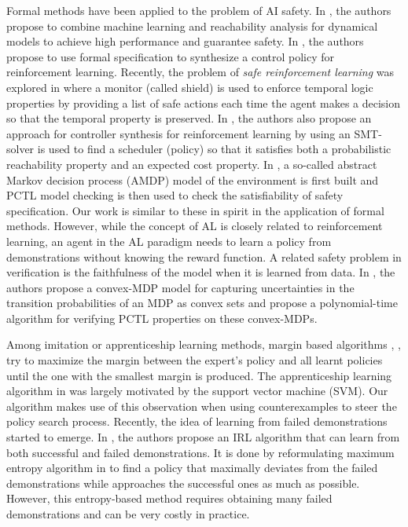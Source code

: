Formal methods have been applied to the problem of AI safety. 
In \cite{gillulay2011guaranteed}, the authors propose to combine machine learning and reachability analysis for dynamical models to achieve high performance and guarantee safety. In \cite{DBLP:journals/corr/SadighKCSS14}, the authors propose to use formal specification to synthesize a control policy for reinforcement learning. Recently, the problem of {\it safe reinforcement learning} was explored in \cite{DBLP:journals/corr/abs-1708-08611} where a monitor (called shield) is used to enforce temporal logic properties by providing a list of safe actions each time the agent makes a decision so that the temporal property is preserved. 
In \cite{junges2016safety}, the authors also propose an approach for controller synthesis for reinforcement learning by using an SMT-solver is used to find a scheduler (policy) so that it satisfies both a probabilistic reachability property and an expected cost property. 
In \cite{mason2017assured}, a so-called abstract Markov decision process (AMDP) model of the environment is first built and PCTL model checking is then used to check the satisfiability of safety specification.
Our work is similar to these in spirit in the application of formal methods. However, while the concept of AL is closely related to reinforcement learning, an agent in the AL paradigm needs to learn a policy from demonstrations without knowing the reward function.
A related safety problem in verification is the faithfulness of the model when it is learned from data. 
In \cite{puggelli-cav13}, the authors propose a convex-MDP model for capturing uncertainties in the transition probabilities of an MDP as convex sets and propose a polynomial-time algorithm for verifying PCTL properties on these convex-MDPs. 

Among imitation or apprenticeship learning methods, margin based algorithms \cite{Abbeel:2004:ALV:1015330.1015430}, \cite{Ng:2000:AIR:645529.657801}, \cite{Ratliff:2006:MMP:1143844.1143936} try to maximize the margin between the expert's policy and all learnt policies until the one with the smallest margin is produced. The apprenticeship learning algorithm in \cite{Abbeel:2004:ALV:1015330.1015430} was largely motivated by the support vector machine (SVM). Our algorithm makes use of this observation when using counterexamples to steer the policy search process.
Recently, the idea of learning from failed demonstrations started to emerge. 
In \cite{shiarlis2016inverse}, the authors propose an IRL algorithm that can learn from both successful and failed demonstrations. It is done by reformulating maximum entropy algorithm in \cite{Ziebart:2008:MEI:1620270.1620297} to find a policy that maximally deviates from the failed demonstrations while approaches the successful ones as much as possible. However, this entropy-based method requires obtaining many failed demonstrations and can be very costly in practice. 

